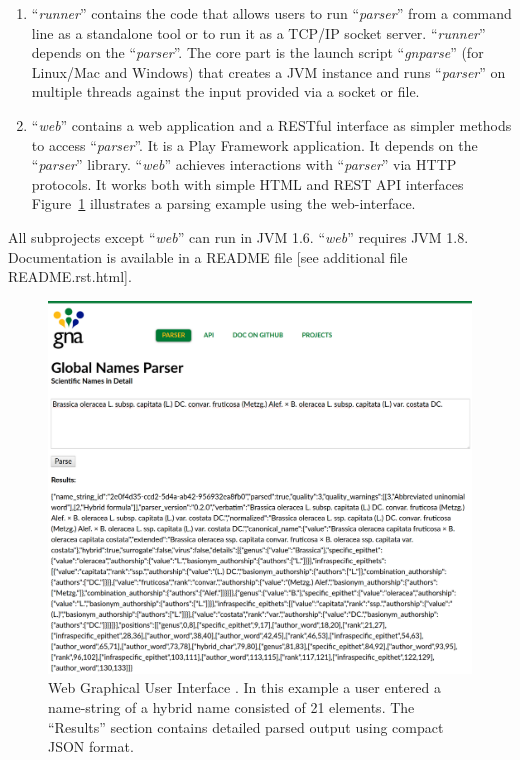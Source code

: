 \documentclass{bmcart}
\begin{document}
\begin{enumerate}
  \item ``\textit{runner}'' contains the code that allows users to run
    ``\textit{parser}'' from a command line as a standalone tool or to run it
    as a TCP/IP socket server. ``\textit{runner}'' depends on the
    ``\textit{parser}''.   The core part is the launch script
    ``\textit{gnparse}'' (for Linux/Mac and Windows) that creates a JVM instance
    and runs ``\textit{parser}'' on multiple threads against the input provided
    via a socket or file.

  \item ``\textit{web}'' contains a web application and a RESTful interface as
    simpler methods to access ``\textit{parser}''. It is a Play Framework
    \cite{wampler2011scala} application. It depends on the ``\textit{parser}''
    library. ``\textit{web}'' achieves interactions with ``\textit{parser}''
    via HTTP protocols. It works both with simple HTML and REST API interfaces
    Figure~\ref{figure:webgui} illustrates a parsing example using the web-interface.

\end{enumerate}

All subprojects except ``\textit{web}'' can run in JVM 1.6. ``\textit{web}''
requires JVM 1.8. Documentation is available in a README file [see additional file README.rst.html].

\begin{figure}[htbp]
  \begin{center}

    \caption{Web Graphical User Interface \cite{gnparser-web}. In this example
      a user entered a name-string of a hybrid name consisted of 21 elements.
      The ``Results'' section contains detailed parsed output using compact
      JSON format.}\label{figure:webgui}

    \vspace{5mm}
    \includegraphics[scale=0.175]{images/2.png}
  \end{center}
\end{figure}
\end{document}
